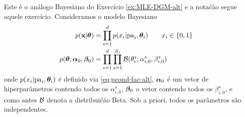 Este \'e o an\'alogo Bayesiano do Exerc\'icio \ref{ex:MLE-DGM-alt} e a
nota\'c\~ao segue aquele exerc\'icio. Consideramos o modelo Bayesiano
\begin{align}
    p(\mathbf{x} | \boldsymbol{\theta}) &= \prod_{i=1}^d p(x_i | \mathrm{pa}_i, \boldsymbol{\theta}_i) \quad \quad x_i \in \{0,1\} \label{eq:p-dag2-alt}\\
    p(\boldsymbol{\theta}; \boldsymbol{\alpha}_0, \boldsymbol{\beta}_0) & = \prod_{i=1}^d \prod_{s=1}^{S_i} \mathcal{B}(\theta_i^s; \alpha_{i,0}^s, \beta_{i,0}^s)
\end{align}
onde $p(x_i | \mathrm{pa}_i, \boldsymbol{\theta}_i)$ \'e definido via \eqref{eq:pcond-fac-alt}, $\boldsymbol{\alpha}_0$ \'e um vetor de hiperpar\^ametros contendo todos os
$\alpha_{i,0}^s$, $\boldsymbol{\beta}_0$ o vetor contendo todos os
$\beta_{i,0}^s$, e como antes $\mathcal{B}$ denota a
distribui\'c\~ao Beta. Sob a priori, todos os par\^ametros s\~ao independentes.

